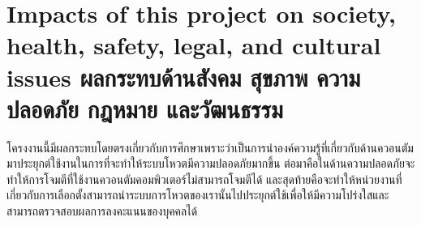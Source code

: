 \section{\ifenglish%
Impacts of this project on society, health, safety, legal, and cultural issues
\else%
ผลกระทบด้านสังคม สุขภาพ ความปลอดภัย กฎหมาย และวัฒนธรรม
\fi}
โครงงานนี้มีผลกระทบโดยตรงเกี่ยวกับการศึกษาเพราะว่าเป็นการนำองค์ความรู้ที่เกี่ยวกับด้านควอนตัมมาประยุกต์ใช้งานในการที่จะทำให้ระบบโหวตมีความปลอดภัยมากขึ้น ต่อมาคือในด้านความปลอดภัยจะทำให้การโจมตีที่ใช้งานควอนตัมคอมพิวเตอร์ไม่สามารถโจมตีได้ และสุดท้ายคือจะทำให้หน่วยงานที่เกี่ยวกับการเลือกตั้งสามารถนำระบบการโหวตของเรานั้นไปประยุกต์ใช้เพื่อให้มีความโปร่งใสและสามารถตรวจสอบผลการลงคะแนนของบุคคลได้